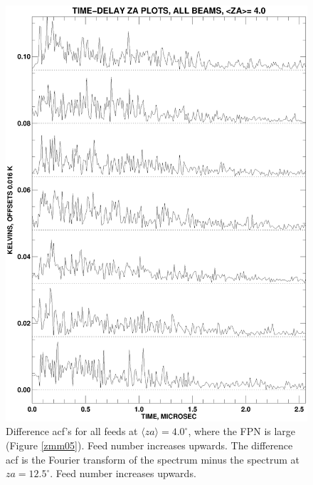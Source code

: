\documentclass[psfig,preprint]{aastex}
\begin{document}
\begin{figure}[!p]
\begin{center}
\includegraphics[width=6in]{zammplot_ft0.ps}   
\end{center}
\caption{Difference acf's for all feeds at $\langle za
\rangle=4.0^\circ$, where the FPN is large (Figure \ref{zmm05}).  Feed
number increases upwards.  The difference acf is the Fourier transform
of the spectrum minus the spectrum at $za = 12.5^\circ$.  Feed number
increases upwards.  \label{zamm_ft0}}
\end{figure}
\end{document}
